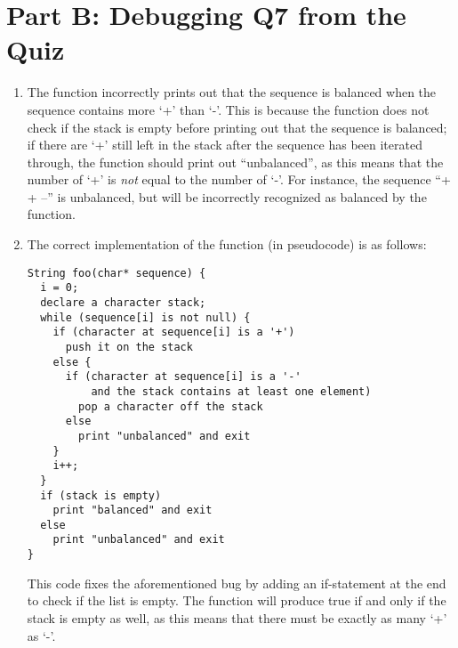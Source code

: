 \documentclass[10pt, notitlepage]{article}
\begin{document}
\section*{Part B: Debugging Q7 from the Quiz}

\begin{enumerate}

\item The function incorrectly prints out that the sequence is balanced when the sequence contains more `+' than `-'. This is because the function does not check if the stack is empty before printing out that the sequence is balanced; if there are `+' still left in the stack after the sequence has been iterated through, the function should print out ``unbalanced'', as this means that the number of `+' is \textit{not} equal to the number of `-'. For instance, the sequence ``+ + --'' is unbalanced, but will be incorrectly recognized as balanced by the function.

\item The correct implementation of the function (in pseudocode) is as follows:
\lstset{language=C++}
\begin{lstlisting}
String foo(char* sequence) {   
  i = 0;
  declare a character stack;   
  while (sequence[i] is not null) {   
    if (character at sequence[i] is a '+')
      push it on the stack   
    else {   
      if (character at sequence[i] is a '-'
          and the stack contains at least one element)
        pop a character off the stack   
      else
        print "unbalanced" and exit   
    }
    i++;
  }
  if (stack is empty)
    print "balanced" and exit
  else
    print "unbalanced" and exit
}
\end{lstlisting}
This code fixes the aforementioned bug by adding an if-statement at the end to check if the list is empty. The function will produce true if and only if the stack is empty as well, as this means that there must be exactly as many `+' as `-'.

\end{enumerate}
\end{document}
